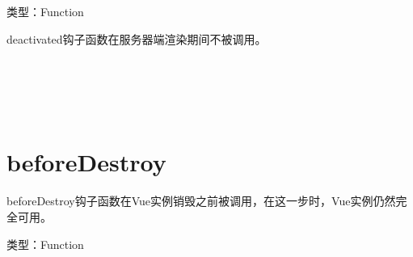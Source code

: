 \begin{compactitem}
\item 类型：Function
\end{compactitem}

deactivated钩子函数在服务器端渲染期间不被调用。





\begin{lstlisting}[language=JavaScript]

\end{lstlisting}




\begin{lstlisting}[language=JavaScript]

\end{lstlisting}




\begin{lstlisting}[language=JavaScript]

\end{lstlisting}




\begin{lstlisting}[language=JavaScript]

\end{lstlisting}




\begin{lstlisting}[language=JavaScript]

\end{lstlisting}




\begin{lstlisting}[language=JavaScript]

\end{lstlisting}





\section{beforeDestroy}





beforeDestroy钩子函数在Vue实例销毁之前被调用，在这一步时，Vue实例仍然完全可用。


\begin{compactitem}
\item 类型：Function
\end{compactitem}

